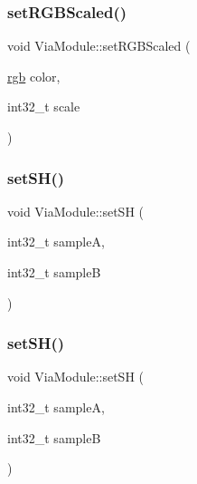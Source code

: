 \mbox{\label{class_via_module_a284349df4c0e5b7153a5b82984fe9aee}} 
\subsubsection{\texorpdfstring{set\+R\+G\+B\+Scaled()}{setRGBScaled()}\hspace{0.1cm}{\footnotesize\ttfamily [2/2]}}
{\footnotesize\ttfamily void Via\+Module\+::set\+R\+G\+B\+Scaled (\begin{DoxyParamCaption}\item[{\mbox{\hyperlink{structrgb}{rgb}}}]{color,  }\item[{int32\+\_\+t}]{scale }\end{DoxyParamCaption})\hspace{0.3cm}{\ttfamily [inline]}}

\mbox{\label{class_via_module_a0f04112b4dde7164b36fa8916e4ae054}} 
\subsubsection{\texorpdfstring{set\+S\+H()}{setSH()}\hspace{0.1cm}{\footnotesize\ttfamily [1/2]}}
{\footnotesize\ttfamily void Via\+Module\+::set\+SH (\begin{DoxyParamCaption}\item[{int32\+\_\+t}]{sampleA,  }\item[{int32\+\_\+t}]{sampleB }\end{DoxyParamCaption})\hspace{0.3cm}{\ttfamily [inline]}}

\mbox{\label{class_via_module_a0f04112b4dde7164b36fa8916e4ae054}} 
\subsubsection{\texorpdfstring{set\+S\+H()}{setSH()}\hspace{0.1cm}{\footnotesize\ttfamily [2/2]}}
{\footnotesize\ttfamily void Via\+Module\+::set\+SH (\begin{DoxyParamCaption}\item[{int32\+\_\+t}]{sampleA,  }\item[{int32\+\_\+t}]{sampleB }\end{DoxyParamCaption})\hspace{0.3cm}{\ttfamily [inline]}}

